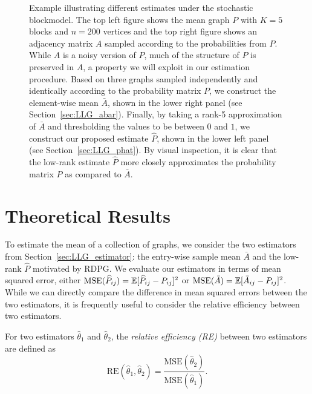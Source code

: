\begin{figure}
\begin{subfigure}{.45\textwidth}
\end{subfigure}
\caption[Example illustrating different estimates under the stochastic blockmodel]{Example illustrating different estimates under the stochastic blockmodel.
The top left figure shows the mean graph $P$ with $K = 5$ blocks and $n=200$ vertices and the top right figure shows an adjacency matrix $A$ sampled according to the probabilities from $P$.
While $A$ is a noisy version of $P$, much of the structure of $P$ is preserved in $A$, a property we will exploit in our estimation procedure.
Based on three graphs sampled independently and identically according to the probability matrix $P$, we construct the element-wise mean $\bar{A}$, shown in the lower right panel (see Section~\ref{sec:LLG_abar}).  
Finally, by taking a rank-5 approximation of $\bar{A}$ and thresholding the values to be between $0$ and $1$, we construct our proposed estimate $\hat{P}$, shown in the lower left panel (see Section~\ref{sec:LLG_phat}).
By visual inspection, it is clear that the low-rank estimate $\hat{P}$ more closely approximates the probability matrix $P$ as compared to $\bar{A}$.
}
\label{fig:SBM_example_full}
\end{figure}








\section{Theoretical Results}
\label{sec:LLG_theoretical_result}

To estimate the mean of a collection of graphs, we consider the two estimators from Section~\ref{sec:LLG_estimator}: the entry-wise sample mean $\bar{A}$ and the low-rank $\hat{P}$ motivated by RDPG.
We evaluate our estimators in terms of mean squared error, either $\mathrm{MSE}(\widehat{P}_{ij})=\mathbb{E}[\widehat{P}_{ij}-P_{ij}]^2$ or $\mathrm{MSE}(\bar{A})=\mathbb{E}[\bar{A}_{ij}-P_{ij}]^2$.
While we can directly compare the difference in mean squared errors between the two estimators, it is frequently useful to consider the relative efficiency between two estimators.

\begin{definition} 
\label{def:RE}
For two estimators $\hat{\theta}_1$ and $\hat{\theta}_2$, the {\em{relative efficiency (RE)}} between two estimators are defined as
\[
	\mathrm{RE}(\hat{\theta}_1, \hat{\theta}_2) = \frac{\mathrm{MSE}(\hat{\theta}_2)}{\mathrm{MSE}(\hat{\theta}_1)}.
\]
\end{definition}

